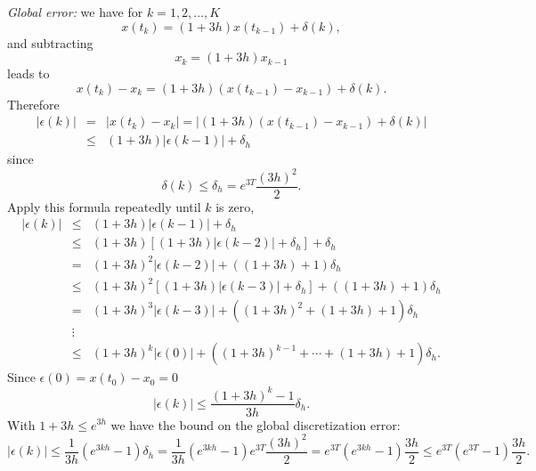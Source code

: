 \documentclass{ximera}
\begin{document}
\begin{exercise}
\begin{solution}
{\em Global error:} we have for $k=1,2,\ldots,K$
\[
x(t_k)=(1+3h)x(t_{k-1})+\delta(k),
\]
and subtracting
\[
x_k = (1+3h)x_{k-1}
\]
leads to
\[
x(t_k) - x_k = (1+3h)(x(t_{k-1})-x_{k-1})+\delta(k).
\]
Therefore
\begin{eqnarray*}
|\epsilon(k)| & = & |x(t_k) - x_k| =
|(1+3h)(x(t_{k-1})-x_{k-1})+\delta(k)|\\
& \le & (1+3h)|\epsilon(k-1)|+\delta_h
\end{eqnarray*}
since
\[
\delta(k)\le \delta_h = e^{3T}\frac{(3h)^2}{2}.
\]
Apply this formula repeatedly until $k$ is zero,
\[
\begin{array}{rcl}
|\epsilon(k)|&\le&(1+3h)|\epsilon(k-1)|+\delta_h\\
&\le& (1+3h)[(1+3h)|\epsilon(k-2)|+\delta_h]+\delta_h\\
&=& (1+3h)^2|\epsilon(k-2)| + ((1+3h) + 1)\delta_h\\
&\le& (1+3h)^2[(1+3h)|\epsilon(k-3)|+\delta_h] + ((1+3h) + 1)\delta_h\\
&=& (1+3h)^3|\epsilon(k-3)| + ((1+3h)^2 + (1+3h) + 1)\delta_h\\
&\vdots& \\
&\le & (1+3h)^k|\epsilon(0)| + ((1+3h)^{k-1} +\cdots + (1+3h) + 1)\delta_h.
\end{array}
\]
Since $\epsilon(0)=x(t_0) - x_0=0$
\[
|\epsilon(k)| \le \frac{(1+3h)^k -1}{3h}\delta_h.
\]
With $1+3h\le e^{3h}$ we have the bound on the global discretization error:
\[
|\epsilon(k)| \le \frac{1}{3h} (e^{3kh}-1)\delta_h=
\frac{1}{3h}(e^{3kh}-1)e^{3T}\frac{(3h)^2}{2} =
e^{3T}(e^{3kh}-1)\frac{3h}{2}
\le e^{3T}(e^{3T}-1)\frac{3h}{2}.
\]

\end{solution}
\end{exercise}
\end{document}
